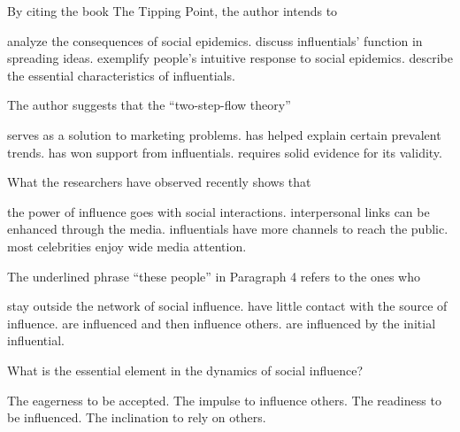 \item By citing the book The Tipping Point, the author intends to
\begin{tasks}
	\task analyze the consequences of social epidemics.
	\task discuss influentials' function in spreading ideas.
	\task exemplify people's intuitive response to social epidemics.
	\task describe the essential characteristics of influentials.
\end{tasks}
\item The author suggests that the ``two-step-flow theory''
\begin{tasks}
	\task serves as a solution to marketing problems.
	\task has helped explain certain prevalent trends.
	\task has won support from influentials.
	\task requires solid evidence for its validity.
\end{tasks}
\item What the researchers have observed recently shows that
\begin{tasks}
	\task the power of influence goes with social interactions.
	\task interpersonal links can be enhanced through the media.
	\task influentials have more channels to reach the public.
	\task most celebrities enjoy wide media attention.
\end{tasks}
\item The underlined phrase ``these people'' in Paragraph 4 refers to the ones who
\begin{tasks}
	\task stay outside the network of social influence.
	\task have little contact with the source of influence.
	\task are influenced and then influence others.
	\task are influenced by the initial influential.
\end{tasks}
\item What is the essential element in the dynamics of social influence?
\begin{tasks}
	\task The eagerness to be accepted.
	\task The impulse to influence others.
	\task The readiness to be influenced.
	\task The inclination to rely on others.
\end{tasks}